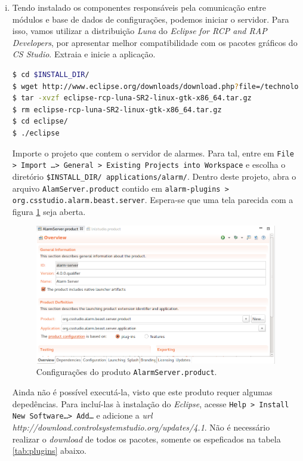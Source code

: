 \begin{enumerate}[i.]
\item Tendo instalado os componentes responsáveis pela comunicação entre módulos
e base de dados de configurações, podemos iniciar o servidor. Para isso, vamos
utilizar a distribuição \textit{Luna} do \textit{Eclipse for RCP and RAP
Developers}, por apresentar melhor compatibilidade com os pacotes gráficos do
\textit{CS Studio}. Extraia e inicie a aplicação.

\begin{lstlisting}[language=bash, style=nonumbers]
$ cd $INSTALL_DIR/
$ wget http://www.eclipse.org/downloads/download.php?file=/technology/epp/downloads/release/luna/SR2/eclipse-rcp-luna-SR2-linux-gtk-x86_64.tar.gz
$ tar -xvzf eclipse-rcp-luna-SR2-linux-gtk-x86_64.tar.gz
$ rm eclipse-rcp-luna-SR2-linux-gtk-x86_64.tar.gz
$ cd eclipse/
$ ./eclipse
\end{lstlisting}

Importe o projeto que contem o servidor de alarmes. Para tal, entre em
\texttt{File > Import \ldots > General > Existing Projects into Workspace} e
escolha o diretório \texttt{\$INSTALL\_DIR/ applications/alarm/}. Dentro deste
projeto, abra o arquivo \texttt{AlamServer.product} contido em
\texttt{alarm-plugins > org.csstudio.alarm.beast.server}. Espera-se que uma tela
parecida com a figura \ref{img:product-view} seja aberta.

\FloatBarrier

\begin{figure}[h]

\centering
\includegraphics[scale=0.40]{image/product-view}
\caption {Configurações do produto \texttt{AlarmServer.product}.}
\label{img:product-view} 
\end{figure}

\FloatBarrier

Ainda não é possível executá-la, visto que este produto requer algumas
depedências. Para incluí-las à instalação do \textit{Eclipse}, acesse
\texttt{Help > Install New Software\ldots > Add\ldots} e adicione a \textit{url}
\textit{http://download.controlsystemstudio.org/updates/4.1}. Não é necessário
realizar o \textit{download} de todos os pacotes, somente os espeficados na
tabela \ref{tab:plugins} abaixo.


\end{enumerate}

